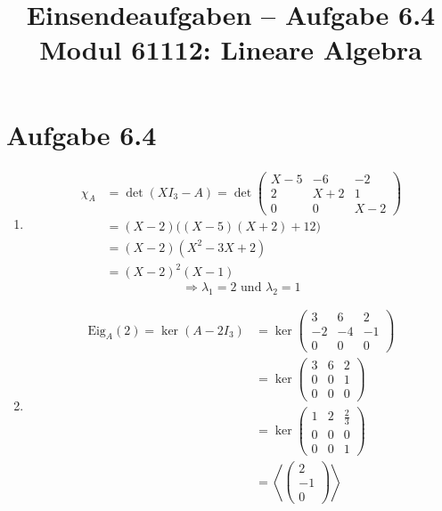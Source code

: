 \documentclass[a4paper,12pt]{article}
\title{Einsendeaufgaben -- Aufgabe 6.4\\[0.5em]
\large Modul 61112: Lineare Algebra}
\author{}
\date{}
\begin{document}
\maketitle

\section*{Aufgabe 6.4}

\begin{enumerate}[label=\alph*)]
  \item
  \begin{align*}
    \chi_A &= \det(X I_3 - A)
      = \det\begin{pmatrix} X-5 & -6 & -2 \\ 2 & X+2 & 1 \\ 0 & 0 & X-2 \end{pmatrix} \\
    &= (X-2)\big((X-5)(X+2)+12\big) \\
    &= (X-2)(X^2-3X+2) \\
    &= (X-2)^2(X-1)
  \end{align*}
  \[
    \Rightarrow \lambda_1 = 2 \text{ und } \lambda_2 = 1
  \]

  \item
  \begin{align*}
    \mathrm{Eig}_A(2) = \ker(A - 2I_3)
    &= \ker\begin{pmatrix} 3 & 6 & 2 \\ -2 & -4 & -1 \\ 0 & 0 & 0 \end{pmatrix} \\
    &= \ker\begin{pmatrix} 3 & 6 & 2 \\ 0 & 0 & 1 \\ 0 & 0 & 0 \end{pmatrix} \\
    &= \ker\begin{pmatrix} 1 & 2 & \tfrac{2}{3} \\ 0 & 0 & 0 \\ 0 & 0 & 1 \end{pmatrix} \\
    &= \left\langle \begin{pmatrix} 2 \\ -1 \\ 0 \end{pmatrix} \right\rangle
  \end{align*}


\end{enumerate}
\end{document}
